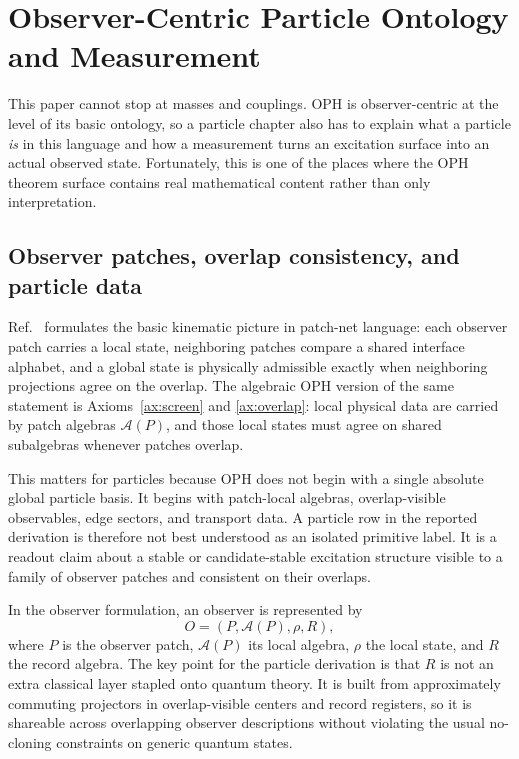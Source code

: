 \documentclass[11pt]{article}
\begin{document}
\section{Observer-Centric Particle Ontology and Measurement}

This paper cannot stop at masses and couplings. OPH is observer-centric at the level of
its basic ontology, so a particle chapter also has to explain what a particle \emph{is} in this
language and how a measurement turns an excitation surface into an actual observed state.
Fortunately, this is one of the places where the OPH theorem surface contains
real mathematical content rather than only interpretation.

\subsection{Observer patches, overlap consistency, and particle data}

Ref.~\cite{ophconsensus} formulates the basic kinematic picture in patch-net language: each observer
patch carries a local state, neighboring patches compare a shared interface alphabet, and a
global state is physically admissible exactly when neighboring projections agree on the overlap.
The algebraic OPH version of the same statement is Axioms~\ref{ax:screen} and
\ref{ax:overlap}: local physical data are carried by patch algebras \(\mathcal A(P)\), and those local
states must agree on shared subalgebras whenever patches overlap.

This matters for particles because OPH does not begin with a single absolute global particle
basis. It begins with patch-local algebras, overlap-visible observables, edge sectors, and
transport data. A particle row in the reported derivation is therefore not best
understood as an isolated primitive label. It is a readout claim about a stable or
candidate-stable excitation structure visible to a family of observer patches and consistent on
their overlaps.

In the observer formulation, an observer is represented by
\[
O=(P,\mathcal A(P),\rho,R),
\]
where \(P\) is the observer patch, \(\mathcal A(P)\) its local algebra, \(\rho\) the local
state, and \(R\) the record algebra. The key point for the particle derivation is that \(R\) is not
an extra classical layer stapled onto quantum theory. It is built from approximately commuting
projectors in overlap-visible centers and record registers, so it is shareable across overlapping
observer descriptions without violating the usual no-cloning constraints on generic quantum
states.
\end{document}
